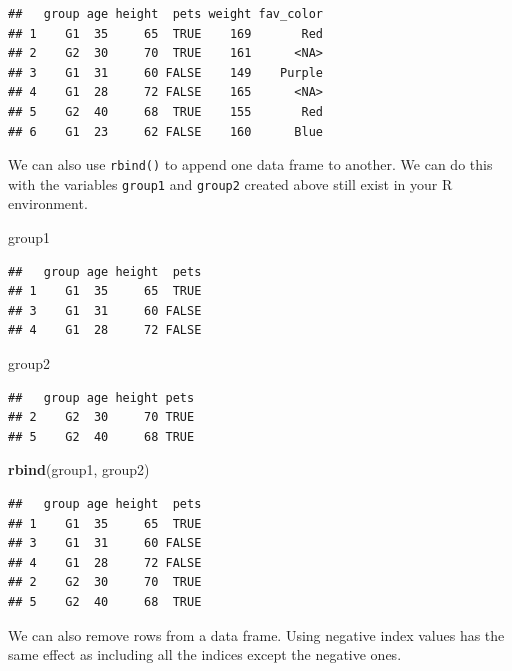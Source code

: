 \documentclass[
]{book}
\newenvironment{Shaded}{\begin{snugshade}}{\end{snugshade}}
\newcommand{\KeywordTok}[1]{\textcolor[rgb]{0.13,0.29,0.53}{\textbf{#1}}}
\newcommand{\NormalTok}[1]{#1}
\begin{document}
\begin{verbatim}
##   group age height  pets weight fav_color
## 1    G1  35     65  TRUE    169       Red
## 2    G2  30     70  TRUE    161      <NA>
## 3    G1  31     60 FALSE    149    Purple
## 4    G1  28     72 FALSE    165      <NA>
## 5    G2  40     68  TRUE    155       Red
## 6    G1  23     62 FALSE    160      Blue
\end{verbatim}

We can also use \texttt{rbind()} to append one data frame to another. We can do this with the variables \texttt{group1} and \texttt{group2} created above still exist in your R environment.

\begin{Shaded}
\begin{Highlighting}[]
\NormalTok{group1}
\end{Highlighting}
\end{Shaded}

\begin{verbatim}
##   group age height  pets
## 1    G1  35     65  TRUE
## 3    G1  31     60 FALSE
## 4    G1  28     72 FALSE
\end{verbatim}

\begin{Shaded}
\begin{Highlighting}[]
\NormalTok{group2}
\end{Highlighting}
\end{Shaded}

\begin{verbatim}
##   group age height pets
## 2    G2  30     70 TRUE
## 5    G2  40     68 TRUE
\end{verbatim}

\begin{Shaded}
\begin{Highlighting}[]
\KeywordTok{rbind}\NormalTok{(group1, group2)}
\end{Highlighting}
\end{Shaded}

\begin{verbatim}
##   group age height  pets
## 1    G1  35     65  TRUE
## 3    G1  31     60 FALSE
## 4    G1  28     72 FALSE
## 2    G2  30     70  TRUE
## 5    G2  40     68  TRUE
\end{verbatim}

We can also remove rows from a data frame. Using negative index values has the same effect as including all the indices except the negative ones.
\end{document}
